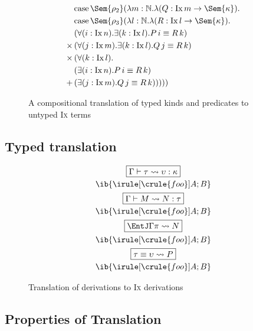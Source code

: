\documentclass[authoryear,acmsmall,screen]{acmart}
\newcommand\IX{\textsc{Ix}}
\newcommand\Nat{\mathbb{N}}
\newcommand\Ix[1]{\mathrm{Ix} \, #1}
\newcommand\Ixed[1]{\ensuremath{\Sem{#1}}}
\renewcommand\Case{\mathrm{case}}
\begin{document}
\begin{figure}[H]
\begin{align*}
\begin{aligned}
              &\Case\, {\Ixed{\rho_{2}}} (\lambda m : \Nat. \lambda (Q : \Ix m \to \Ixed{\kappa}). \\                               
              &\Case\, {\Ixed{\rho_{3}}} (\lambda l : \Nat. \lambda (R : \Ix l \to \Ixed{\kappa}). \\                               
              &(\forall (i : \Ix n). \exists (k : \Ix l). P \, i \equiv R \, k) \\ 
              \times \, &(\forall (j : \Ix m). \exists (k : \Ix l). Q \, j \equiv R \, k) \\
              \times \, &(\forall (k : \Ix l). \\
                &(\exists (i : \Ix n). P \, i \equiv R\, k) \\
                +\, &(\exists (j : \Ix m). Q \, j \equiv R\, k)))))
  \end{aligned}                                           
\end{align*}
\caption{A compositional translation of typed \RO kinds and predicates to untyped \IX{} terms}
\label{fig:translation}
\end{figure}

\subsection{Typed translation}

\begin{figure}[H]
\small
\begin{gather*}
\fbox{$\Gamma \vdash \tau \leadsto \upsilon : \kappa$}
\\
\ib{\irule[\crule{foo}]{A};{B}} \\
\fbox{$\Gamma \vdash M \leadsto N : \tau$}
\\
\ib{\irule[\crule{foo}]{A};{B}} \\
\fbox{${\EntJ \Gamma \pi} \leadsto N$}
\\
\ib{\irule[\crule{foo}]{A};{B}}  \\
\fbox{${\tau \equiv \upsilon} \leadsto P$}
\\
\ib{\irule[\crule{foo}]{A};{B}} 
\end{gather*}
\caption{Translation of \RO derivations to \IX{} derivations}
\end{figure}

\subsection{Properties of Translation}
\end{document}
